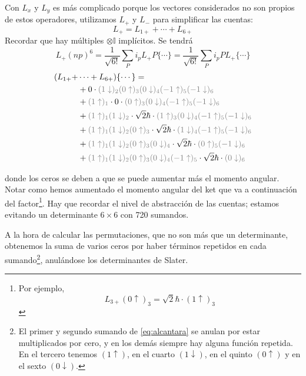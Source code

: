 Con $L_x$ y $L_y$ es más complicado porque los vectores considerados
no son propios de estos operadores, utilizamos $L_+$ y $L_-$ para
simplificar las cuentas:
\begin{equation}
  L_+ = L_{1+} + \cdots + L_{6+}
\end{equation}
Recordar que hay múltiples $\otimes \mathbb{I}$ implícitos. Se tendrá 
\begin{equation}
  L_+(np)^6 = \frac{1}{\sqrt{6!}} \sum_{P} i_p L_+
    P\{\cdots\}  = \frac{1}{\sqrt{6!}} \sum_{P} i_p P L_+\{\cdots\}
  \label{eq:htnht}
\end{equation}
\begin{equation}
  \begin{split}
    (L_{1+} + &\cdots + L_{6+})\{\cdots\} = \\
   &+ 0 \cdot \textcolor{gray}{(1\downarrow)_2(0\uparrow)_3 (0\downarrow)_4(-1\uparrow)_5(-1\downarrow)_6} \\
   &+ \textcolor{gray}{(1\uparrow)_1}\cdot 0 \cdot \textcolor{gray}{\textcolor{gray}{(0\uparrow)_3 (0\downarrow)_4(-1\uparrow)_5(-1\downarrow)_6}} \\
   &+ \textcolor{gray}{(1\uparrow)_1(1\downarrow)_2 }\cdot\sqrt{2}\hbar\cdot\textcolor{gray}{(1\uparrow)_3 (0\downarrow)_4(-1\uparrow)_5(-1\downarrow)_6} \\
   &+ \textcolor{gray}{(1\uparrow)_1(1\downarrow)_2(0\uparrow)_3}\cdot \sqrt{2}\hbar\cdot\textcolor{gray}{(1\downarrow)_4(-1\uparrow)_5(-1\downarrow)_6} \\
   &+ \textcolor{gray}{(1\uparrow)_1(1\downarrow)_2(0\uparrow)_3 (0\downarrow)_4}\cdot\sqrt{2}\hbar\cdot\textcolor{gray}{(0\uparrow)_5(-1\downarrow)_6} \\
   &+ \textcolor{gray}{(1\uparrow)_1(1\downarrow)_2(0\uparrow)_3 (0\downarrow)_4(-1\uparrow)_5}\cdot\sqrt{2}\hbar\cdot\textcolor{gray}{(0\downarrow)_6} \\
  \end{split}
  \label{eq:alcantara}
\end{equation}

donde los ceros se deben a que se puede aumentar más el momento angular. Notar como hemos aumentado
el momento angular del ket que va a continuación del
factor\footnote{Por ejemplo, \[L_{3+}(0\uparrow)_3 =
\sqrt{2}\hbar\cdot(1\uparrow)_3\]}. Hay que recordar el nivel de
abstracción de las cuentas; estamos evitando un determinante
$6\times6$ con 720 sumandos.


A la hora de calcular las permutaciones, que no son más que un determinante, obtenemos la suma de varios ceros por haber términos repetidos en cada sumando\footnote{El primer y segundo sumando de \eqref{eq:alcantara} se anulan por estar multiplicados por cero, y en los demás siempre hay alguna función repetida. En el tercero tenemos $(1\uparrow)$, en el cuarto $(1\downarrow)$, en el quinto $(0\uparrow)$ y en el sexto $(0\downarrow)$.}, anulándose los determinantes de Slater.

